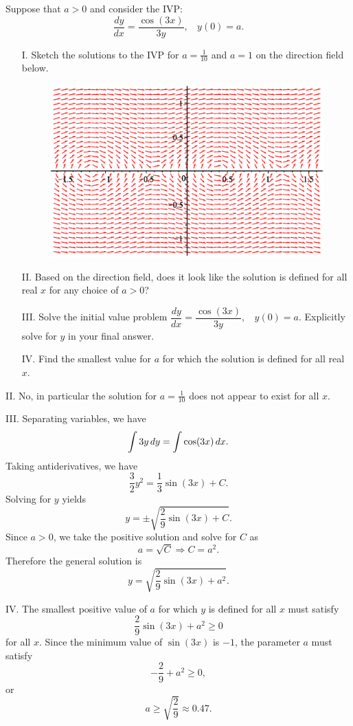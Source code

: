 \documentclass[noauthor,handout]{ximera}
\begin{document}
\begin{problem} 

Suppose that $a>0$ and consider the IVP:  $$\dfrac{dy}{dx} = \dfrac{\cos(3x)}{3y}, ~ ~ ~ ~ y(0)=a.$$

\begin{itemize}
\item[I.] Sketch the solutions to the IVP for $a=\frac{1}{10}$ and $a=1$ on the direction field below.

 \begin{figure}[h!]
 \centering
  \includegraphics[width=.5 \textwidth]{IVP.eps}
\end{figure}

\item[II.] Based on the direction field, does it look like the solution is defined for all real $x$ for any choice of $a>0$?
\item[III.] Solve the initial value problem $\dfrac{dy}{dx} = \dfrac{\cos(3x)}{3y}, ~ ~ ~ ~ y(0)=a$.  Explicitly solve for $y$ in your final answer.
\item[IV.] Find the smallest value for $a$ for which the solution is defined for all real $x$.
\end{itemize}

\begin{freeResponse}
II. No, in particular the solution for $a=\frac{1}{10}$ does not appear to exist for all $x$. 

III. Separating variables, we have
$$
\int 3y \mathop{}\!d y = \int \cos (3x) \mathop{}\!d x.
$$
Taking antiderivatives, we have
$$
\frac{3}{2}y^2 = \frac{1}{3} \sin(3x) + C.
$$
Solving for $y$ yields
$$
y = \pm \sqrt{\frac{2}{9} \sin(3x) + C}.
$$
Since $a > 0$, we take the positive solution and solve for $C$ as
$$
a = \sqrt{C} \Rightarrow C = a^2.
$$
Therefore the general solution is
$$
y = \sqrt{\frac{2}{9} \sin(3x) + a^2}.
$$

IV. The smallest positive value of $a$ for which $y$ is defined for all $x$ must satisfy
$$
\frac{2}{9} \sin(3x) + a^2 \geq 0
$$
for all $x$. Since the minimum value of $\sin(3x)$ is $-1$, the parameter $a$ must satisfy
$$
-\frac{2}{9} + a^2 \geq 0,
$$
or 
$$
a \geq \sqrt{\frac{2}{9}} \approx 0.47.
$$
\end{freeResponse}
\end{problem}
\end{document}
